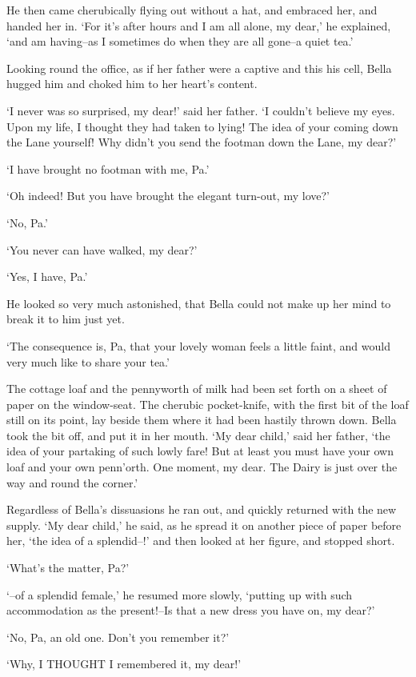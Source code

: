 He then came cherubically flying out without a hat, and embraced her,
and handed her in. ‘For it’s after hours and I am all alone, my dear,’
he explained, ‘and am having--as I sometimes do when they are all
gone--a quiet tea.’

Looking round the office, as if her father were a captive and this his
cell, Bella hugged him and choked him to her heart’s content.

‘I never was so surprised, my dear!’ said her father. ‘I couldn’t
believe my eyes. Upon my life, I thought they had taken to lying! The
idea of your coming down the Lane yourself! Why didn’t you send the
footman down the Lane, my dear?’

‘I have brought no footman with me, Pa.’

‘Oh indeed! But you have brought the elegant turn-out, my love?’

‘No, Pa.’

‘You never can have walked, my dear?’

‘Yes, I have, Pa.’

He looked so very much astonished, that Bella could not make up her mind
to break it to him just yet.

‘The consequence is, Pa, that your lovely woman feels a little faint,
and would very much like to share your tea.’

The cottage loaf and the pennyworth of milk had been set forth on a
sheet of paper on the window-seat. The cherubic pocket-knife, with the
first bit of the loaf still on its point, lay beside them where it had
been hastily thrown down. Bella took the bit off, and put it in her
mouth. ‘My dear child,’ said her father, ‘the idea of your partaking of
such lowly fare! But at least you must have your own loaf and your own
penn’orth. One moment, my dear. The Dairy is just over the way and round
the corner.’

Regardless of Bella’s dissuasions he ran out, and quickly returned with
the new supply. ‘My dear child,’ he said, as he spread it on another
piece of paper before her, ‘the idea of a splendid--!’ and then looked
at her figure, and stopped short.

‘What’s the matter, Pa?’

‘--of a splendid female,’ he resumed more slowly, ‘putting up with
such accommodation as the present!--Is that a new dress you have on, my
dear?’

‘No, Pa, an old one. Don’t you remember it?’

‘Why, I THOUGHT I remembered it, my dear!’

